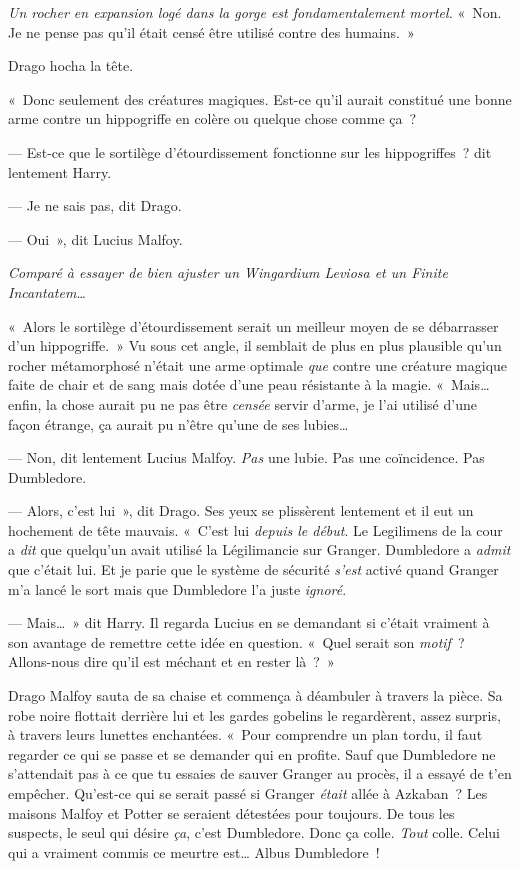 \emph{Un rocher en expansion logé dans la gorge est fondamentalement mortel.} «~Non. Je ne pense pas qu'il était censé être utilisé contre des humains.~»

Drago hocha la tête.

«~Donc seulement des créatures magiques. Est-ce qu'il aurait constitué une bonne arme contre un hippogriffe en colère ou quelque chose comme ça~?

--- Est-ce que le sortilège d'étourdissement fonctionne sur les hippogriffes~? dit lentement Harry.

--- Je ne sais pas, dit Drago.

--- Oui~», dit Lucius Malfoy.

\emph{Comparé à essayer de bien ajuster un Wingardium Leviosa et un Finite Incantatem…}

«~Alors le sortilège d'étourdissement serait un meilleur moyen de se débarrasser d'un hippogriffe.~» Vu sous cet angle, il semblait de plus en plus plausible qu'un rocher métamorphosé n'était une arme optimale \emph{que} contre une créature magique faite de chair et de sang mais dotée d'une peau résistante à la magie. «~Mais… enfin, la chose aurait pu ne pas être \emph{censée} servir d'arme, je l'ai utilisé d'une façon étrange, ça aurait pu n'être qu'une de ses lubies…

--- Non, dit lentement Lucius Malfoy. \emph{Pas} une lubie. Pas une coïncidence. Pas Dumbledore.

--- Alors, c'est lui~», dit Drago. Ses yeux se plissèrent lentement et il eut un hochement de tête mauvais. «~C'est lui \emph{depuis le début}. Le Legilimens de la cour a \emph{dit} que quelqu'un avait utilisé la Légilimancie sur Granger. Dumbledore a \emph{admit} que c'était lui. Et je parie que le système de sécurité \emph{s'est} activé quand Granger m'a lancé le sort mais que Dumbledore l'a juste \emph{ignoré}.

--- Mais…~» dit Harry. Il regarda Lucius en se demandant si c'était vraiment à son avantage de remettre cette idée en question. «~Quel serait son \emph{motif}~? Allons-nous dire qu'il est méchant et en rester là~?~»

Drago Malfoy sauta de sa chaise et commença à déambuler à travers la pièce. Sa robe noire flottait derrière lui et les gardes gobelins le regardèrent, assez surpris, à travers leurs lunettes enchantées. «~Pour comprendre un plan tordu, il faut regarder ce qui se passe et se demander qui en profite. Sauf que Dumbledore ne s'attendait pas à ce que tu essaies de sauver Granger au procès, il a essayé de t'en empêcher. Qu'est-ce qui se serait passé si Granger \emph{était} allée à Azkaban~? Les maisons Malfoy et Potter se seraient détestées pour toujours. De tous les suspects, le seul qui désire \emph{ça}, c'est Dumbledore. Donc ça colle. \emph{Tout} colle. Celui qui a vraiment commis ce meurtre est… Albus Dumbledore~!

